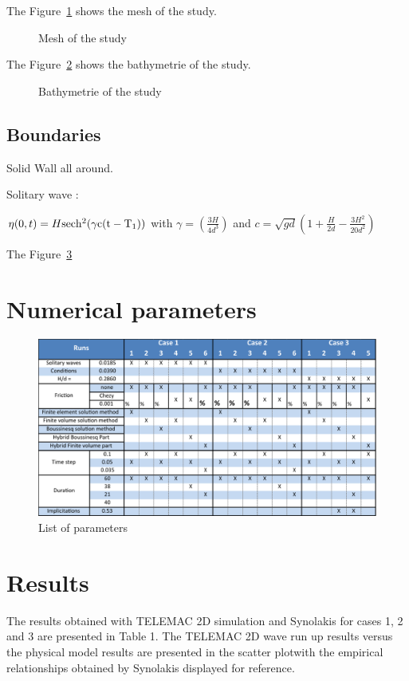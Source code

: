 The Figure~\ref{fig:tests:mesh} shows the mesh of the study.
\begin{figure}
\centering
{}
\caption{Mesh of the study}\label{fig:tests:mesh}
\end{figure}


The Figure~\ref{fig:tests:bathy} shows the bathymetrie of the study.
\begin{figure}
\centering
{}
\caption{Bathymetrie of the study}\label{fig:tests:bathy}
\end{figure}

\subsection{Boundaries}

Solid Wall all around.

Solitary wave :

$\eta(0,t) = H \rm{sec } h^{2}(\gamma c(t-T_{1}))$ with $\gamma=(\frac{3H}{4d^{3}})$ and
$c=\sqrt{gd}(1+\frac{H}{2d}-\frac{3H^{2}}{20d^{2}})$

The Figure~\ref{fig:tests:params}
\section{Numerical parameters}
\begin{figure}
\centering
\includegraphics[width=.6\textwidth]{img/run_param.png}
\caption{List of parameters}\label{fig:tests:params}
\end{figure}

\section{Results}

The results obtained with TELEMAC 2D simulation and  Synolakis for cases 1, 2
and 3 are presented in Table 1. The TELEMAC 2D wave run up results versus the
physical model results are presented in the scatter plotwith the empirical
relationships obtained by Synolakis displayed for reference.

